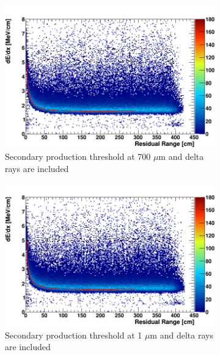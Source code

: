 \begin{figure}[tbp!]
        \begin{subfigure}[b]{0.495\textwidth}   
            \centering 
            \includegraphics[width=\textwidth]{derr_mu_delta_700um}
            \caption{Secondary production threshold at 700 $\mu$m and delta rays are included}%
            \label{fig:derr_mu_delta_700}
        \end{subfigure}
        \hfill
        \begin{subfigure}[b]{0.495\textwidth}   
            \centering 
            \includegraphics[width=\textwidth]{derr_mu_delta_1um}
            \caption{Secondary production threshold at 1 $\mu$m and delta rays are included}%
            \label{fig:derr_mu_delta_1}
        \end{subfigure}
        \begin{subfigure}[b]{0.495\textwidth}   

\end{subfigure}
\end{figure}
